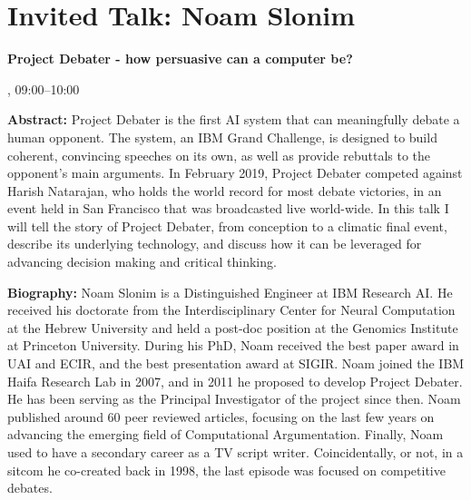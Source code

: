 \section{Invited Talk: Noam Slonim}

\begin{center}
\begin{Large}
    {\bfseries\Large Project Debater - how persuasive can a computer be?} 
\vspace{1em}\par
\end{Large}

\daydateyear, 09:00--10:00 \vspace{1em}\\
\vspace{1em}\par
\end{center}

\noindent
{\bfseries Abstract:} Project Debater is the first AI system that can meaningfully debate a human opponent. The system, an IBM Grand Challenge, is designed to build coherent, convincing speeches on its own, as well as provide rebuttals to the opponent’s main arguments. In February 2019, Project Debater competed against Harish Natarajan, who holds the world record for most debate victories, in an event held in San Francisco that was broadcasted live world-wide. In this talk I will tell the story of Project Debater, from conception to a climatic final event, describe its underlying technology, and discuss how it can be leveraged for advancing decision making and critical thinking.

\vspace{3em}\par 

\vfill
\noindent

{\bfseries Biography:} 
Noam Slonim is a Distinguished Engineer at IBM Research AI. He received his doctorate from the Interdisciplinary Center for Neural Computation at the Hebrew University and held a post-doc position at the Genomics Institute at Princeton University. During his PhD, Noam received the best paper award in UAI and ECIR, and the best presentation award at SIGIR. Noam joined the IBM Haifa Research Lab in 2007, and in 2011 he proposed to develop Project Debater. He has been serving as the Principal Investigator of the project since then. Noam published around 60 peer reviewed articles, focusing on the last few years on advancing the emerging field of Computational Argumentation. Finally, Noam used to have a secondary career as a TV script writer. Coincidentally, or not, in a sitcom he co-created back in 1998, the last episode was focused on competitive debates.

\newpage
